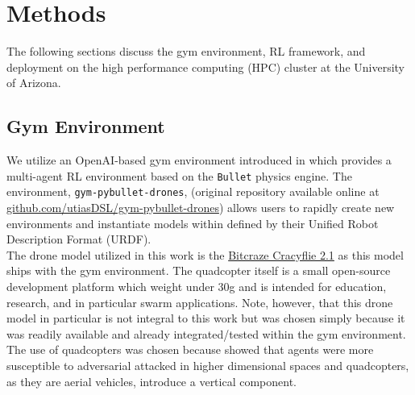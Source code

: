 \documentclass{article}
\begin{document}
\section{Methods}\label{sec:methods}
The following sections discuss the gym environment, RL framework, and deployment on the high performance computing (HPC) cluster at the University of Arizona.

\subsection{Gym Environment}\label{subsec:gym_env}
We utilize an OpenAI-based gym environment introduced in \cite{Panerati2021} which provides a multi-agent RL environment based on the \texttt{Bullet} physics engine. 
The environment, \texttt{gym-pybullet-drones}, (original repository available online at \url{github.com/utiasDSL/gym-pybullet-drones}) allows users to rapidly create new environments and instantiate models within defined by their Unified Robot Description Format (URDF). \\

\noindent
The drone model utilized in this work is the \href{https://www.bitcraze.io/documentation/hardware/crazyflie_2_1/crazyflie_2_1-datasheet.pdf}{Bitcraze Cracyflie 2.1} as this model ships with the gym environment. 
The quadcopter itself is a small open-source development platform which weight under 30g and is intended for education, research, and in particular swarm applications. 
Note, however, that this drone model in particular is not integral to this work but was chosen simply because it was readily available and already integrated/tested within the gym environment.
The use of quadcopters was chosen because \cite{Gleave2019}  showed that agents were more susceptible to adversarial attacked in higher dimensional spaces and quadcopters, as they are aerial vehicles, introduce a vertical component. 
\end{document}

